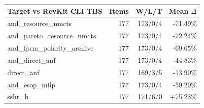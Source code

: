 \begin{tabular}{lrrr}
\toprule
Target vs RevKit CLI TBS & Items & W/L/T & Mean $\Delta$ \\
\midrule
and\_resource\_nmcts & 177 & 173/0/4 & -71.49\% \\
and\_pareto\_resource\_nmcts & 177 & 173/0/4 & -72.24\% \\
and\_fprm\_polarity\_archive & 177 & 173/0/4 & -69.65\% \\
and\_direct\_anf & 177 & 173/0/4 & -44.83\% \\
direct\_anf & 177 & 169/3/5 & -13.90\% \\
and\_esop\_milp & 177 & 173/0/4 & -59.20\% \\
sshr\_h & 177 & 171/6/0 & +75.23\% \\
\bottomrule
\end{tabular}
